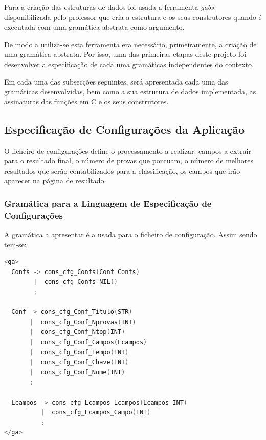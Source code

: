 \documentclass[11pt, a4paper, oneside]{article}
\begin{document}
Para a criação das estruturas de dados foi usada a ferramenta \textit{gabs} disponibilizada pelo professor que cria a estrutura e os seus construtores quando é executada com uma gramática abstrata como argumento.

De modo a utiliza-se esta ferramenta era necessário, primeiramente, a criação de uma gramática abstrata. Por isso, uma das primeiras etapas deste projeto foi desenvolver a especificação de cada uma gramáticas independentes do contexto. 

Em cada uma das subsecções seguintes, será apresentada cada uma das gramáticas desenvolvidas, bem como a sua estrutura de dados implementada, as assinaturas das funções em C e os seus construtores.

\subsection{Especificação de Configurações da Aplicação}
O ficheiro de configurações define o processamento a realizar: campos a extrair para o resultado final, o número de provas que pontuam, o número de melhores resultados que serão contabilizados para a classificação, os campos que irão aparecer na página de resultado.


\subsubsection{Gramática para a Linguagem de Especificação de Configurações}

A gramática a apresentar é a usada para o ficheiro de configuração. Assim sendo tem-se:

\begin{lstlisting}[language=C, caption={Gramática para a linguagem de especificação de
 configurações.}]
<ga>
  Confs -> cons_cfg_Confs(Conf Confs)
        |  cons_cfg_Confs_NIL()
        ;

  Conf -> cons_cfg_Conf_Titulo(STR)
       |  cons_cfg_Conf_Nprovas(INT)
       |  cons_cfg_Conf_Ntop(INT)
       |  cons_cfg_Conf_Campos(Lcampos)
       |  cons_cfg_Conf_Tempo(INT)
       |  cons_cfg_Conf_Chave(INT)
       |  cons_cfg_Conf_Nome(INT)
       ;

  Lcampos -> cons_cfg_Lcampos_Lcampos(Lcampos INT)
          |  cons_cfg_Lcampos_Campo(INT)
          ;
</ga>
\end{lstlisting}
\end{document}
